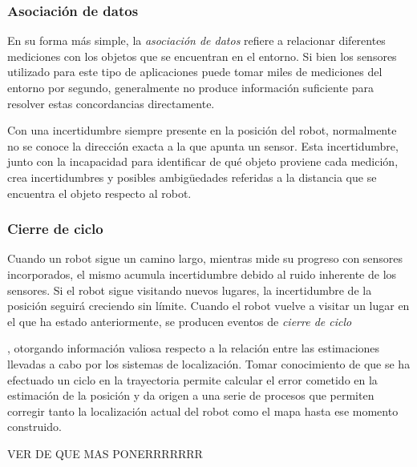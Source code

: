 \subsubsection{Asociación de datos}
En su forma más simple, la \textit{asociación de datos} refiere a relacionar diferentes mediciones con los objetos que se encuentran en el entorno. Si bien los sensores utilizado para este tipo de aplicaciones puede tomar miles de mediciones del entorno por segundo, generalmente no produce información suficiente para resolver estas concordancias directamente.

Con una incertidumbre siempre presente en la posición del robot, normalmente no se conoce la dirección exacta a la que apunta un sensor. Esta incertidumbre, junto con la incapacidad para identificar de qué objeto proviene cada medición, crea incertidumbres y posibles ambigüedades referidas a la distancia que se encuentra el objeto respecto al robot.

\subsubsection{Cierre de ciclo}
Cuando un robot sigue un camino largo, mientras mide su progreso con sensores incorporados, el mismo acumula incertidumbre debido al ruido inherente de los sensores. Si el robot sigue visitando nuevos lugares, la incertidumbre de la posición seguirá creciendo sin límite. Cuando el robot vuelve a visitar un lugar en el que ha estado anteriormente, se producen eventos de \textit{cierre de ciclo}
\begin{large}
\end{large}, otorgando información valiosa respecto a la relación entre las estimaciones llevadas a cabo por los sistemas de localización. Tomar conocimiento de que se ha efectuado un ciclo en la trayectoria permite calcular el error cometido en la estimación de la posición y da origen a una serie de procesos que permiten corregir tanto la localización actual del robot como el mapa hasta ese momento construido.

\begin{large}
VER DE QUE MAS PONERRRRRRR
\end{large}{}

